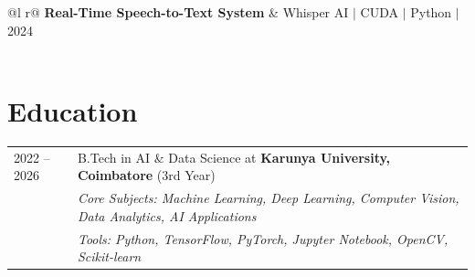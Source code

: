 \documentclass[a4paper,12pt]{article}
\begin{document}
\vspace{4pt}

\begin{tabularx}{\linewidth}{ @{}l r@{} }
\textbf{Real-Time Speech-to-Text System} & \hfill Whisper AI $|$ CUDA $|$ Python $|$ 2024 \\[2pt]
 \\
\end{tabularx}

\section{Education}
\begin{tabularx}{\linewidth}{@{}l X@{}}
2022 -- 2026 & B.Tech in AI \& Data Science at \textbf{Karunya University, Coimbatore} \hfill \normalsize{(3rd Year)} \\
& \textit{Core Subjects: Machine Learning, Deep Learning, Computer Vision, Data Analytics, AI Applications} \\
& \textit{Tools: Python, TensorFlow, PyTorch, Jupyter Notebook, OpenCV, Scikit-learn} \\
\end{tabularx}

\end{document}
